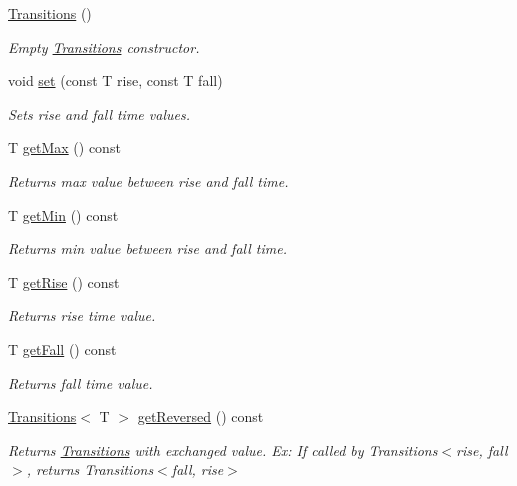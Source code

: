 \begin{DoxyCompactItemize}
\hyperlink{classTransitions_a5eb22fbf6b9a14410efc696742ee34df}{Transitions} ()
\begin{DoxyCompactList}\small\item\em Empty \hyperlink{classTransitions}{Transitions} constructor. \end{DoxyCompactList}\item 
void \hyperlink{classTransitions_aa237e34f678bd0aae62be692dc4059dc}{set} (const T rise, const T fall)
\begin{DoxyCompactList}\small\item\em Sets rise and fall time values. \end{DoxyCompactList}\item 
T \hyperlink{classTransitions_a59e47d34d366733da94f784c0177f8d9}{get\-Max} () const 
\begin{DoxyCompactList}\small\item\em Returns max value between rise and fall time. \end{DoxyCompactList}\item 
T \hyperlink{classTransitions_a37bb8749642ad21d22b264f39003d2ce}{get\-Min} () const 
\begin{DoxyCompactList}\small\item\em Returns min value between rise and fall time. \end{DoxyCompactList}\item 
T \hyperlink{classTransitions_ad88835ca81b7008ecfb7824bc5c17045}{get\-Rise} () const 
\begin{DoxyCompactList}\small\item\em Returns rise time value. \end{DoxyCompactList}\item 
T \hyperlink{classTransitions_affdb33e440b6ac3e6e685d83d46b3189}{get\-Fall} () const 
\begin{DoxyCompactList}\small\item\em Returns fall time value. \end{DoxyCompactList}\item 
\hyperlink{classTransitions}{Transitions}$<$ T $>$ \hyperlink{classTransitions_ac6e5a9efd02d3da3751fcaa845c7955b}{get\-Reversed} () const 
\begin{DoxyCompactList}\small\item\em Returns \hyperlink{classTransitions}{Transitions} with exchanged value. Ex\-: If called by Transitions$<$rise, fall$>$, returns Transitions$<$fall, rise$>$ \end{DoxyCompactList}\item 

\end{DoxyCompactItemize}
